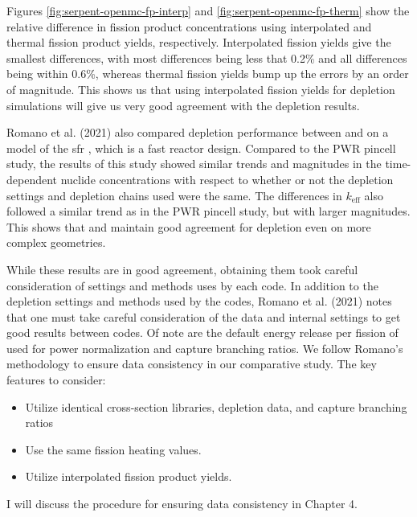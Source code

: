 Figures \ref{fig:serpent-openmc-fp-interp} and
\ref{fig:serpent-openmc-fp-therm} show the relative difference in fission
product concentrations using interpolated and thermal fission product yields,
respectively. Interpolated fission yields give the smallest differences, with
most differences being less that 0.2\% and all differences being within 0.6\%,
whereas thermal fission yields bump up the errors by an order of magnitude. This
shows us that using interpolated fission yields for \OpenMC depletion
simulations will give us very good agreement with the \SerpentTWO depletion
results.

Romano et al. (2021) also compared depletion performance between \OpenMC and
\SerpentTWO on a model of the \Gls{sfr} \cite{oecd_benchmark_2016}, which is a
fast reactor design. Compared to the PWR pincell study, the results of this
study showed similar trends and magnitudes in the time-dependent nuclide
concentrations with respect to whether or not the depletion settings and
depletion chains used were the same. The differences in $k_\text{eff}$ also
followed a similar trend as in the PWR pincell study, but with larger
magnitudes. This shows that \OpenMC and \SerpentTWO maintain good agreement for
depletion even on more complex geometries.

While these results are in good agreement, obtaining them took careful
consideration of settings and methods uses by each code. In addition to the
depletion settings and methods used by the codes,  Romano et al. (2021) notes
that one must take careful consideration of the data and internal settings to
get good results between codes. Of note are the default energy release per
fission of  used for power normalization and capture branching
ratios. We follow Romano's methodology to ensure data consistency in our
comparative study. The key features to consider:
\begin{itemize}
    \item Utilize identical cross-section libraries, depletion data, and capture
    branching ratios
    \item Use the same fission heating values.
    \item Utilize interpolated fission product yields.
\end{itemize}
I will discuss the procedure for ensuring data consistency in Chapter 4.

